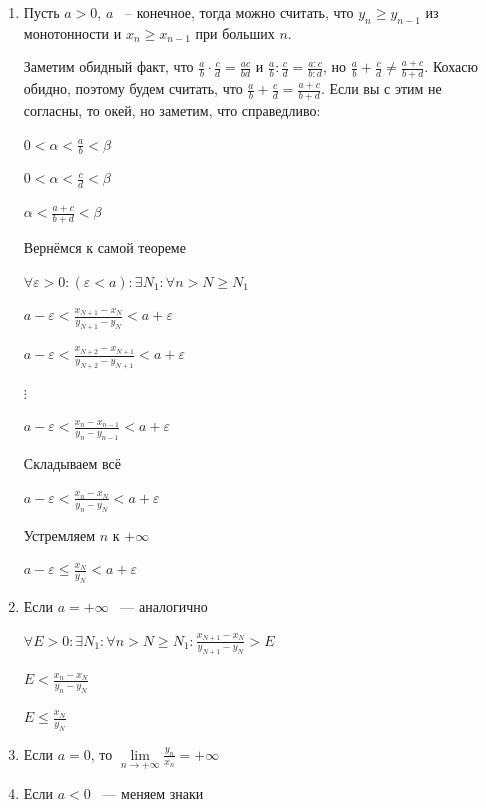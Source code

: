 \documentclass{article}
\begin{document}
			\begin{enumerate}
			
				\item Пусть $a > 0$, $a$ ~-- конечное, тогда можно считать, что $y_n \geq y_{n - 1}$ из монотонности и $x_n \geq x_{n - 1}$ при больших $n$.
			
					Заметим обидный факт, что $\frac{a}{b} \cdot \frac{c}{d} = \frac{ac}{bd}$ и $\frac{a}{b} : \frac{c}{d} = \frac{a : c}{b : d}$, но $\frac{a}{b} + \frac{c}{d} \neq \frac{a + c}{b + d}$. Кохасю обидно, поэтому будем считать, что $\frac{a}{b} + \frac{c}{d} = \frac{a + c}{b + d}$. Если вы с этим не согласны, то окей, но заметим, что справедливо:
			
					$0 < \alpha < \frac{a}{b} < \beta$
			
					$0 < \alpha < \frac{c}{d} < \beta$
			
					$\alpha < \frac{a + c}{b + d} < \beta$
			
					Вернёмся к самой теореме
			
					$\forall \varepsilon > 0 : (\varepsilon < a) : \exists N_1 : \forall n > N \geq N_1$
			
					$a - \varepsilon < \frac{x_{N + 1} - x_N}{y_{N + 1} - y_N} < a + \varepsilon$
			
					$a - \varepsilon < \frac{x_{N + 2} - x_{N + 1}}{y_{N + 2} - y_{N + 1}} < a + \varepsilon$
			
					$\vdots$
			
					$a - \varepsilon < \frac{x_n - x_{n - 1}}{y_n - y_{n - 1}} < a + \varepsilon$
			
					Складываем всё
			
					$a - \varepsilon < \frac{x_n - x_N}{y_n - y_N} < a + \varepsilon$
			
					Устремляем $n$ к $+\infty$
			
					$a - \varepsilon \leq \frac{x_N}{y_N} < a + \varepsilon$
			
				\item Если $a = +\infty$ ~--- аналогично
				
					$\forall E > 0 : \exists N_1 : \forall n > N \geq N_1 : \frac{x_{N + 1} - x_{N}}{y_{N + 1} - y_N} > E$
					
					$E < \frac{x_n - x_N}{y_n - y_N}$
					
					$E \leq \frac{x_N}{y_N}$
					
				\item Если $a = 0$, то $\lim\limits_{n \rightarrow +\infty} \frac{y_n}{x_n} = +\infty$
				
				\item Если $a < 0$ ~--- меняем знаки
				
			\end{enumerate}						
		
\end{document}
